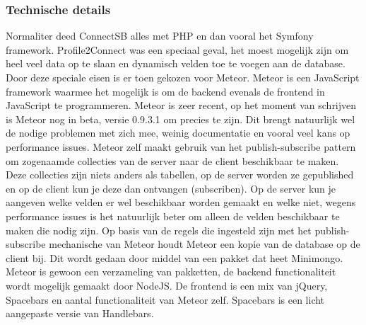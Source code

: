 \subsubsection{Technische details}
Normaliter deed ConnectSB alles met PHP en dan vooral het Symfony framework. Profile2Connect was een speciaal geval, het moest mogelijk zijn om heel veel data op te slaan en dynamisch velden toe te voegen aan de database. Door deze speciale eisen is er toen gekozen voor Meteor. Meteor is een JavaScript framework waarmee het mogelijk is om de backend evenals de frontend in JavaScript te programmeren. Meteor is zeer recent, op het moment van schrijven is Meteor nog in beta, versie 0.9.3.1 om precies te zijn. Dit brengt natuurlijk wel de nodige problemen met zich mee, weinig documentatie en vooral veel kans op performance issues. Meteor zelf maakt gebruik van het publish-subscribe pattern om zogenaamde collecties van de server naar de client beschikbaar te maken. Deze collecties zijn niets anders als tabellen, op de server worden ze gepublished en op de client kun je deze dan ontvangen (subscriben). Op de server kun je aangeven welke velden er wel beschikbaar worden gemaakt en welke niet, wegens performance issues is het natuurlijk beter om alleen de velden beschikbaar te maken die nodig zijn. Op basis van de regels die ingesteld zijn met het publish-subscribe mechanische van Meteor houdt Meteor een kopie van de database op de client bij. Dit wordt gedaan door middel van een pakket dat heet Minimongo. Meteor is gewoon een verzameling van pakketten, de backend functionaliteit wordt mogelijk gemaakt door NodeJS. De frontend is een mix van jQuery, Spacebars en aantal functionaliteit van Meteor zelf. Spacebars is een licht aangepaste versie van Handlebars.

\clearpage